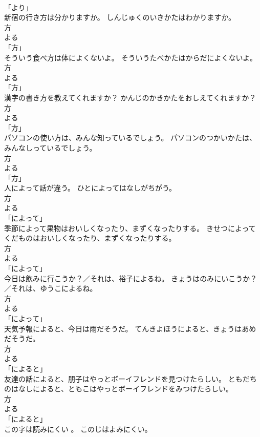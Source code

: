 \documentclass[8pt]{extreport}
\begin{document}
\begin{CJK}{UTF8}{min}
\\	「より」 
\\	新宿の行き方は分かりますか。	しんじゅくのいきかたはわかりますか。	
\\	方 
\\	よる 
\\	「方」 
\\	そういう食べ方は体によくないよ。	そういうたべかたはからだによくないよ。	
\\	方 
\\	よる 
\\	「方」 
\\	漢字の書き方を教えてくれますか？	かんじのかきかたをおしえてくれますか？	
\\	方 
\\	よる 
\\	「方」 
\\	パソコンの使い方は、みんな知っているでしょう。	パソコンのつかいかたは、みんなしっているでしょう。	
\\	方 
\\	よる 
\\	「方」 
\\	人によって話が違う。	ひとによってはなしがちがう。	
\\	方 
\\	よる 
\\	「によって」 
\\	季節によって果物はおいしくなったり、まずくなったりする。	きせつによってくだものはおいしくなったり、まずくなったりする。	
\\	方 
\\	よる 
\\	「によって」 
\\	今日は飲みに行こうか？／それは、裕子によるね。	きょうはのみにいこうか？／それは、ゆうこによるね。	
\\	方 
\\	よる 
\\	「によって」 
\\	天気予報によると、今日は雨だそうだ。	てんきよほうによると、きょうはあめだそうだ。	
\\	方 
\\	よる 
\\	「によると」	
\\	友達の話によると、朋子はやっとボーイフレンドを見つけたらしい。	ともだちのはなしによると、ともこはやっとボーイフレンドをみつけたらしい。	
\\	方 
\\	よる 
\\	「によると」	
\\	この字は読みにくい 。	このじはよみにくい。	

\end{CJK}
\end{document}
